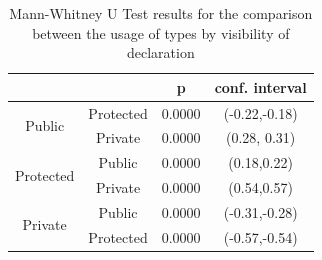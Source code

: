\documentclass[preprint]{sigplanconf}
\renewcommand{\arraystretch}{1.2}
\begin{document}
\begin{table}[h]

\centering{}%
\renewcommand{\arraystretch}{1.2}

\begin{tabular}{|c|c|c|c|}
\hline 
								& {}		& p		& conf. interval	\\
\hline
\hline
\multirow{2}{*}{Public}			& Protected	& 0.0000 & (-0.22,-0.18)	\\ 
								& Private	& 0.0000 &  (0.28, 0.31)	\\
\hline  
\multirow{2}{*}{Protected}		& Public	& 0.0000 & (0.18,0.22)	\\
								& Private	& 0.0000 & (0.54,0.57)	\\
\hline  
\multirow{2}{*}{Private}		& Public	& 0.0000 & (-0.31,-0.28)	\\
								& Protected	& 0.0000 & (-0.57,-0.54)	\\
\hline  
\end{tabular}
\label{tab:all_utest_visibility}
\caption{Mann-Whitney U Test results for the comparison between the usage of types by visibility of declaration}
\end{table}


% 
% 
% 
\end{document}

